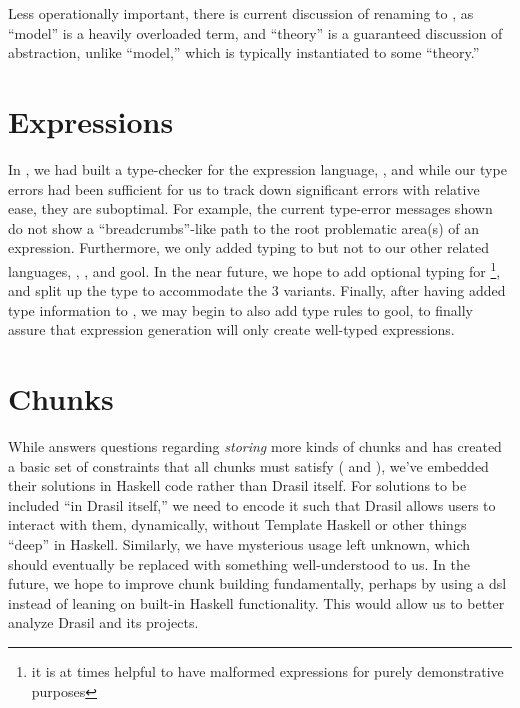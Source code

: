 Less operationally important, there is current discussion of renaming
\ModelKinds{} to \TheoryKinds{} \cite{DrasilIssue2599RenamingModels}, as
``model'' is a heavily overloaded term, and ``theory'' is a guaranteed
discussion of abstraction, unlike ``model,'' which is typically instantiated to
some ``theory.''

\section{Expressions}
\label{chap:futureWork:sec:expressions}

In , we had built a type-checker for the expression
language, \Expr{}, and while our type errors had been sufficient for us to track
down significant errors with relative ease, they are suboptimal. For example,
the current type-error messages shown do not show a ``breadcrumbs''-like path to
the root problematic area(s) of an expression. Furthermore, we only added typing
to \Expr{} but not to our other related languages, \CodeExpr{}, \ModelExpr{},
and \acs{gool}. In the near future, we hope to add optional typing for
\ModelExpr{}\footnote{it is at times helpful to have malformed expressions for
purely demonstrative purposes}, and split up the \Space{} type to accommodate
the 3 variants. Finally, after having added type information to \CodeExpr{}, we
may begin to also add type rules to \acs{gool}, to finally assure that
expression generation will only create well-typed expressions.

\section{Chunks}
\label{chap:futureWork:sec:chunks}

While  answers questions regarding \textit{storing}
more kinds of chunks and has created a basic set of constraints that all chunks
must satisfy (\HasUID{} and \HasChunkRefs{}), we've embedded their solutions in
Haskell code rather than Drasil itself. For solutions to be included ``in Drasil
itself,'' we need to encode it such that Drasil allows users to interact with
them, dynamically, without Template Haskell\cite{GHC2020TemplateHaskell} or
other things ``deep'' in Haskell. Similarly, we have mysterious \Typeable{}
usage left unknown, which should eventually be replaced with something
well-understood to us. In the future, we hope to improve chunk building
fundamentally, perhaps by using a \acs{dsl} instead of leaning on built-in
Haskell functionality. This would allow us to better analyze Drasil and its
projects.

